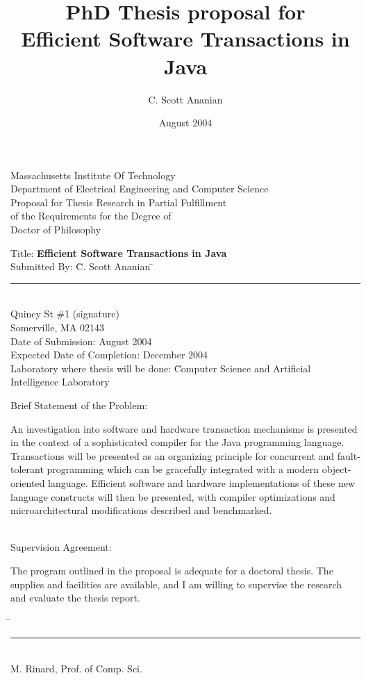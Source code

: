 \documentclass[12pt,oneside]{article}
\title{{\large PhD Thesis proposal for}\\
Efficient Software Transactions in Java}
\author{C. Scott Ananian}
\date{August 2004\\\vspace{5pt}}
\begin{document}

\begin{titlepage}
\setlength{\baselineskip}{0.8\baselineskip}
\newcommand{\nl}{\\[0.4\baselineskip]}
\newcommand{\tight}{\\[-0.1\baselineskip]}
\newcommand{\tighter}{\\[-0.2\baselineskip]}
\begin{centering}\large
Massachusetts Institute Of Technology\tight
Department of Electrical Engineering and Computer Science\nl
%
Proposal for Thesis Research in Partial Fulfillment\tight
of the Requirements for the Degree of\tight
Doctor of Philosophy\nl
\end{centering}
\vspace{0.05cm}
\begin{tabbing}
Title: \textbf{Efficient Software Transactions in Java}\nl
Submitted By: \= C. Scott Ananian \hspace{3cm}\=\rule{6cm}{0.5pt}\tighter
               Quincy St \#1             \>(signature)\tighter
              \> Somerville, MA 02143\nl
Date of Submission: August 2004\tighter
Expected Date of Completion: December 2004\tighter
Laboratory where thesis will be done: \=Computer Science and Artificial\tighter
\>Intelligence Laboratory%
\end{tabbing}
Brief Statement of the Problem:

An investigation into software and hardware transaction mechanisms
is presented in the context of a sophisticated compiler for the Java
programming language.  Transactions will be presented as an organizing
principle for concurrent and fault-tolerant programming which can be
gracefully integrated with a modern object-oriented language.
Efficient software and hardware implementations of these new language
constructs will then be presented, with compiler optimizations and
microarchitectural modifications described and benchmarked.

~\\Supervision Agreement:

The program outlined in the proposal is adequate for a doctoral
thesis.  The supplies and facilities are available, and I am willing
to supervise the research and evaluate the thesis report.

\begin{tabbing}
\hspace{3.5in}\=\kill
\>\rule{2.5in}{0.5pt}\\
\>M. Rinard, Prof. of Comp. Sci.\\
\end{tabbing}

\end{titlepage}
\end{document}
